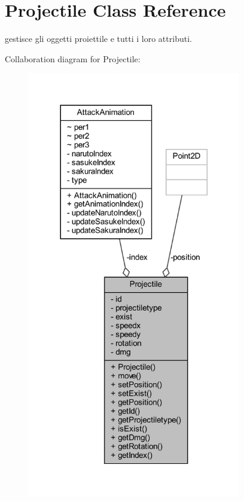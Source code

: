 \hypertarget{classobjects_1_1_projectile}{}\section{Projectile Class Reference}
\label{classobjects_1_1_projectile}


gestisce gli oggetti proiettile e tutti i loro attributi.  




Collaboration diagram for Projectile\+:\nopagebreak
\begin{figure}[H]
\begin{center}
\leavevmode
\includegraphics[width=264pt]{classobjects_1_1_projectile__coll__graph}
\end{center}
\end{figure}
